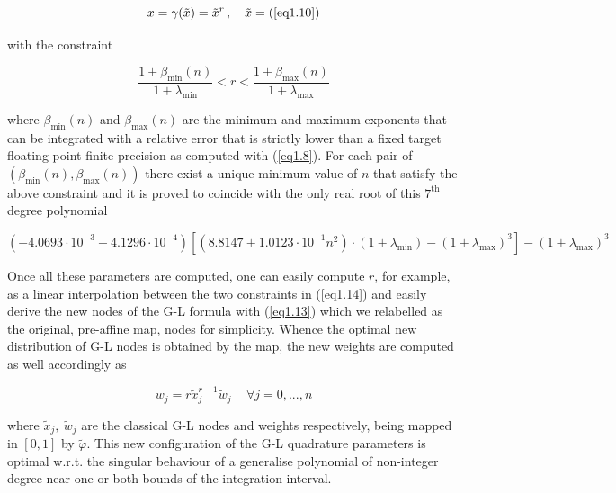 \documentclass[a4paper, twosided]{book}
\begin{document}
\begin{equation}\label{eq1.13}
    x = \gamma(\tilde{x}) = \tilde{x}^r\,,\quad\tilde{x}=(\ref{eq1.10})
\end{equation}

\noindent
with the constraint

\begin{equation}\label{eq1.14}
    \frac{1+\beta_{\text{min}}(n)}{1+\lambda_{\text{min}}} < r < \frac{1+\beta_{\text{max}}(n)}{1+\lambda_{\text{max}}}
\end{equation}

\noindent
where $\beta_{\text{min}}(n)$ and $\beta_{\text{max}}(n)$ are the minimum and maximum exponents that can be integrated with a relative error that is strictly lower than a fixed target floating-point finite precision as computed with (\ref{eq1.8}). For each pair of $(\beta_{\text{min}}(n),\beta_{\text{max}}(n))$ there exist a unique minimum value of $n$ that satisfy the above constraint and it is proved \cite{Lombardi09} to coincide with the only real root of this $7^{\text{th}}$ degree polynomial

\begin{equation}\label{eq1.15}
    (-4.0693\cdot10^{-3}+4.1296\cdot10^{-4})[(8.8147+1.0123\cdot10^{-1}n^2)\cdot(1+\lambda_{\text{min}})-(1+\lambda_{\text{max}})^3] - (1+\lambda_{\text{max}})^3
\end{equation}

\noindent
Once all these parameters are computed, one can easily compute $r$, for example, as a linear interpolation between the two constraints in (\ref{eq1.14}) and easily derive the new nodes of the G-L formula with (\ref{eq1.13}) which we relabelled as the original, pre-affine map, nodes for simplicity. Whence the optimal new distribution of G-L nodes is obtained by the map, the new weights are computed as well accordingly \cite{Lombardi09,Lombardi21} as

\begin{equation}\label{eq1.16}
    w_j = r\tilde{x}_j^{r-1}\tilde{w}_j\,\quad\forall j=0,...,n
\end{equation}

\noindent
where $\tilde{x}_j,\:\tilde{w}_j$ are the classical G-L nodes and weights respectively, being mapped in $[0,1]$ by $\tilde{\varphi}$. This new configuration of the G-L quadrature parameters is optimal w.r.t. the singular behaviour of a generalise polynomial of non-integer degree near one or both bounds of the integration interval.
\end{document}
